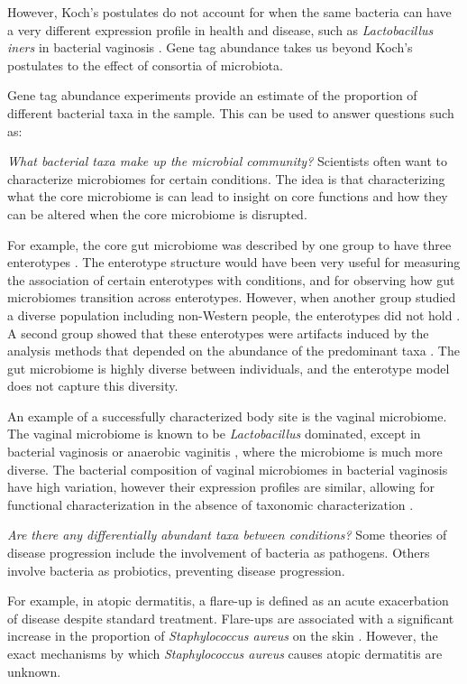 However, Koch’s postulates do not account for when the same bacteria can have a very different expression profile in health and disease, such as \textit{Lactobacillus iners} in bacterial vaginosis \cite{macklaim2013comparative}. Gene tag abundance takes us beyond Koch's postulates to the effect of consortia of microbiota.

Gene tag abundance experiments provide an estimate of the proportion of different bacterial taxa in the sample. This can be used to answer questions such as:

\textit{What bacterial taxa make up the microbial community?}
Scientists often want to characterize microbiomes for certain conditions. The idea is that characterizing what the core microbiome is can lead to insight on core functions and how they can be altered when the core microbiome is disrupted.

For example, the core gut microbiome was described by one group to have three enterotypes \cite{arumugam2011enterotypes}. The enterotype structure would have been very useful for measuring the association of certain enterotypes with conditions, and for observing how gut microbiomes transition across enterotypes. However, when another group studied a diverse population including non-Western people, the enterotypes did not hold \cite{yatsunenko2012human}. A second group showed that these enterotypes were artifacts induced by the analysis methods that depended on the abundance of the predominant taxa \cite{gorvitovskaia2016interpreting}. The gut microbiome is highly diverse between individuals, and the enterotype model does not capture this diversity.

An example of a successfully characterized body site is the vaginal microbiome. The vaginal microbiome is known to be \textit{Lactobacillus} dominated, except in bacterial vaginosis \cite{hummelen2010deep} or anaerobic vaginitis \cite{donders2002definition}, where the microbiome is much more diverse. The bacterial composition of vaginal microbiomes in bacterial vaginosis have high variation, however their expression profiles are similar, allowing for functional characterization in the absence of taxonomic characterization \cite{macklaim2013comparative}.

\textit{Are there any differentially abundant taxa between conditions?}
Some theories of disease progression include the involvement of bacteria as pathogens. Others involve bacteria as probiotics, preventing disease progression.

For example, in atopic dermatitis, a flare-up is defined as an acute exacerbation of disease despite standard treatment. Flare-ups are associated with a significant increase in the proportion of \textit{Staphylococcus aureus} on the skin \cite{kong2012temporal}. However, the exact mechanisms by which \textit{Staphylococcus aureus} causes atopic dermatitis are unknown.

